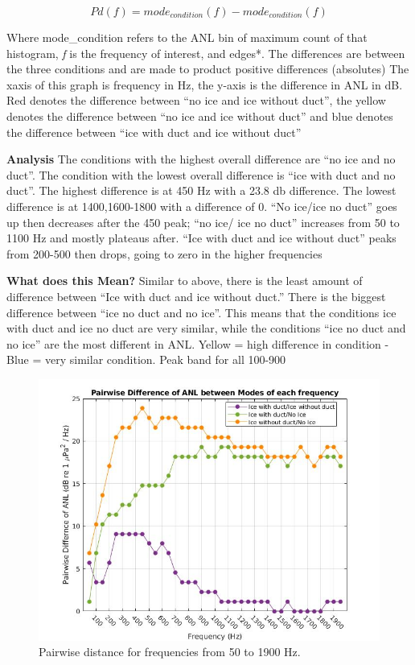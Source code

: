 \[Pd(f)=mode_{condition}(f)-mode_{condition}(f)\] 	%

Where mode\_{condition} refers to the ANL bin of maximum count of that histogram, \textit{f} is the frequency of interest, and edges*. The differences are between the three conditions and are made to product positive differences (absolutes)
The xaxis of this graph is frequency in Hz, the y-axis is the difference in ANL in dB. Red denotes the difference between “no ice and ice without duct”, the yellow denotes the difference between “no ice and ice without duct” and blue denotes the difference between “ice with duct and ice without duct”

\textbf{Analysis}
The conditions with the highest overall difference are “no ice and no duct”. The condition with the lowest overall difference is “ice with duct and no duct”. The highest difference is at 450 Hz with a 23.8 db difference. The lowest difference is at 1400,1600-1800 with a difference of 0.
“No ice/ice no duct” goes up then decreases after the 450 peak; “no ice/ ice no duct” increases from 50 to 1100 Hz and mostly plateaus after. “Ice with duct and ice without duct” peaks from 200-500 then drops, going to zero in the higher frequencies

\textbf{What does this Mean?}
Similar to above, there is the least amount of difference between “Ice with duct and ice without duct.” There is the biggest difference between “ice no duct and no ice”. This means that the conditions ice with duct and ice no duct are very similar, while the conditions “ice no duct and no ice” are the most different in ANL. 
Yellow = high difference in condition - Blue = very similar condition. Peak band for all 100-900

\begin{figure}[h]
\centering
\includegraphics[scale=0.5]{Figures/recolor_pairwise_dist_ANLs.jpg}
\caption{Pairwise distance for frequencies from 50 to 1900 Hz.}
\label{fig_pairwisedist}
\end{figure}

